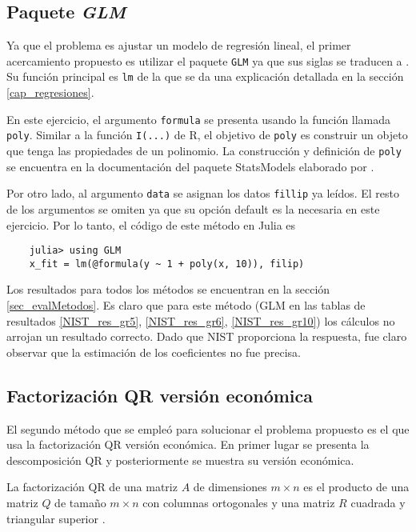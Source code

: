 \subsection{Paquete \textit{GLM}}

Ya que el problema es ajustar un modelo de regresión lineal, el primer acercamiento propuesto es utilizar el paquete \texttt{GLM} ya que sus siglas se traducen a . Su función principal es \texttt{lm} de la que se da una explicación detallada en la sección \ref{cap_regresiones}. 

En este ejercicio, el argumento \texttt{formula} se presenta usando la función llamada \texttt{poly}. Similar a la función \texttt{I(...)} de \textsf{R}, el objetivo de \texttt{poly} es construir un objeto que tenga las propiedades de un polinomio. La construcción y definición  de \texttt{poly} se encuentra en la documentación del paquete \textsf{StatsModels} elaborado por \cite{StatsModel_manual}. 

Por otro lado, al argumento \texttt{data} se asignan los datos \texttt{fillip} ya leídos. El resto de los argumentos se omiten ya que su opción default es la necesaria en este ejercicio. Por lo tanto, el código de este método en \textsf{Julia} es 


\begin{verbatim}
    julia> using GLM
    x_fit = lm(@formula(y ~ 1 + poly(x, 10)), filip)
\end{verbatim}


Los resultados para todos los métodos se encuentran en la sección \ref{sec_evalMetodos}. Es claro que para este método (GLM en las tablas de resultados \ref{NIST_res_gr5}, \ref{NIST_res_gr6}, \ref{NIST_res_gr10}) los cálculos no arrojan un resultado correcto. Dado que NIST proporciona la respuesta, fue claro observar que la estimación de los coeficientes no fue precisa.


\subsection{Factorización QR versión económica}

El segundo método que se empleó para solucionar el problema propuesto es el que usa la factorización QR versión económica. En primer lugar se presenta la descomposición QR y posteriormente se muestra su versión económica.

\begin{definition}
La factorización QR de una matriz $A$ de dimensiones $m \times n$ es el producto de una matriz $Q$ de tamaño $m \times n$ con columnas ortogonales y una matriz $R$ cuadrada y triangular superior \cite[p.~191]{garcia2017second}. 
\end{definition}

